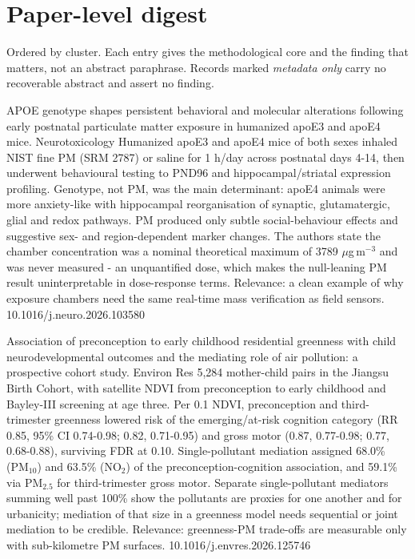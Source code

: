 \documentclass[10pt]{article}
\begin{document}
\vspace{4mm}

\section*{\sffamily\bfseries\color{Deep}Paper-level digest}
\vspace{-1.5mm}{\color{Amber}\rule{\linewidth}{1.1pt}}\vspace{1mm}

{\fontsize{7.4}{9}\selectfont\color{Slate}Ordered by cluster. Each entry gives the
methodological core and the finding that matters, not an abstract paraphrase. Records
marked \textit{metadata only} carry no recoverable abstract and assert no finding.\par}


{APOE genotype shapes persistent behavioral and molecular alterations following early postnatal particulate matter exposure in humanized apoE3 and apoE4 mice.}
{Neurotoxicology}
{Humanized apoE3 and apoE4 mice of both sexes inhaled NIST fine PM (SRM 2787) or saline for 1 h/day across postnatal days 4-14, then underwent behavioural testing to PND96 and hippocampal/striatal expression profiling. Genotype, not PM, was the main determinant: apoE4 animals were more anxiety-like with hippocampal reorganisation of synaptic, glutamatergic, glial and redox pathways. PM produced only subtle social-behaviour effects and suggestive sex- and region-dependent marker changes. The authors state the chamber concentration was a nominal theoretical maximum of 3789 $\mu$g\,m$^{-3}$ and was never measured - an unquantified dose, which makes the null-leaning PM result uninterpretable in dose-response terms. Relevance: a clean example of why exposure chambers need the same real-time mass verification as field sensors.}
{10.1016/j.neuro.2026.103580}

{Association of preconception to early childhood residential greenness with child neurodevelopmental outcomes and the mediating role of air pollution: a prospective cohort study.}
{Environ Res}
{5,284 mother-child pairs in the Jiangsu Birth Cohort, with satellite NDVI from preconception to early childhood and Bayley-III screening at age three. Per 0.1 NDVI, preconception and third-trimester greenness lowered risk of the emerging/at-risk cognition category (RR 0.85, 95\% CI 0.74-0.98; 0.82, 0.71-0.95) and gross motor (0.87, 0.77-0.98; 0.77, 0.68-0.88), surviving FDR at 0.10. Single-pollutant mediation assigned 68.0\% (PM$_{10}$) and 63.5\% (NO$_2$) of the preconception-cognition association, and 59.1\% via PM$_{2.5}$ for third-trimester gross motor. Separate single-pollutant mediators summing well past 100\% show the pollutants are proxies for one another and for urbanicity; mediation of that size in a greenness model needs sequential or joint mediation to be credible. Relevance: greenness-PM trade-offs are measurable only with sub-kilometre PM surfaces.}
{10.1016/j.envres.2026.125746}
\end{document}
